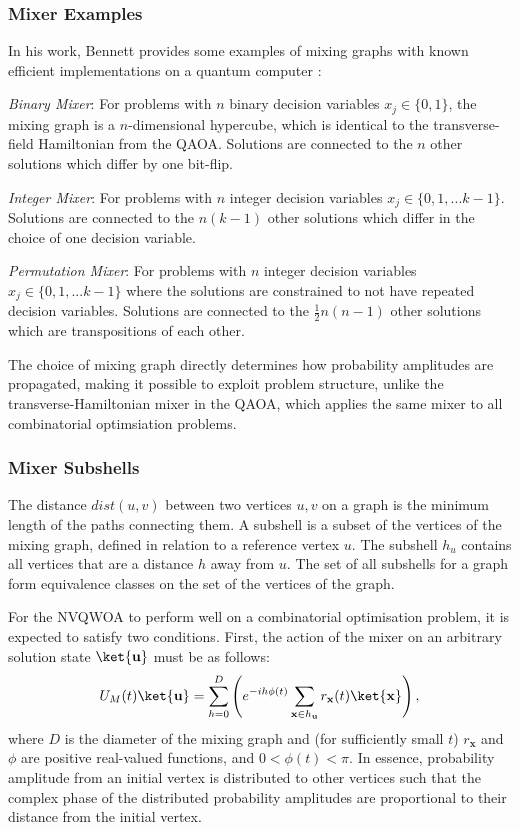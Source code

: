 \subsubsection{Mixer Examples}

In his work, Bennett provides some examples of mixing graphs with known efficient implementations on a quantum computer \cite{bennett2024nonvariational,bennett2024analysisnonvariationalquantumwalkbased}:

\textit{Binary Mixer}: For problems with $n$ binary decision variables $x_j\in\{0,1\}$, the mixing graph is a $n$-dimensional hypercube, which is identical to the transverse-field Hamiltonian from the QAOA. Solutions are connected to the $n$ other solutions which differ by one bit-flip.

\textit{Integer Mixer}: For problems with $n$ integer decision variables $x_j\in\{0,1,...k-1\}$. Solutions are connected to the $n(k-1)$ other solutions which differ in the choice of one decision variable.

\textit{Permutation Mixer}: For problems with $n$ integer decision variables $x_j\in\{0,1,...k-1\}$ where the solutions are constrained to not have repeated decision variables. Solutions are connected to the $\frac{1}{2}n(n-1)$ other solutions which are transpositions of each other.

The choice of mixing graph directly determines how probability amplitudes are propagated, making it possible to exploit problem structure, unlike the transverse-Hamiltonian mixer in the QAOA, which applies the same mixer to all combinatorial optimsiation problems\cite{QAOA}.

\subsubsection{Mixer Subshells}\label{sec:subshell}
The distance $dist(u,v)$ between two vertices $u,v$ on a graph is the minimum length of the paths connecting them. A subshell is a subset of the vertices of the mixing graph, defined in relation to a reference vertex $u$. The subshell $h_u$ contains all vertices that are a distance $h$ away from $u$. The set of all subshells for a graph form equivalence classes on the set of the vertices of the graph.

For the NVQWOA to perform well on a combinatorial optimisation problem, it is expected to satisfy two conditions. First, the action of the mixer on an arbitrary solution state $\ket{\mathbf{u}}$ must be as follows:
$$
U_M(t)\ket{\mathbf{u}}=\sum_{h=0}^D \left(e^{-ih\phi(t)} \sum_{\mathbf{x}\in h_{\mathbf{u}}} r_\mathbf{x}(t)\ket{\mathbf{x}} \right),
$$
where $D$ is the diameter of the mixing graph and (for sufficiently small $t$) $r_\mathbf{x}$ and $\phi$ are positive real-valued functions, and $0<\phi(t)<\pi$. In essence, probability amplitude from an initial vertex is distributed to other vertices such that the complex phase of the distributed probability amplitudes are proportional to their distance from the initial vertex.

